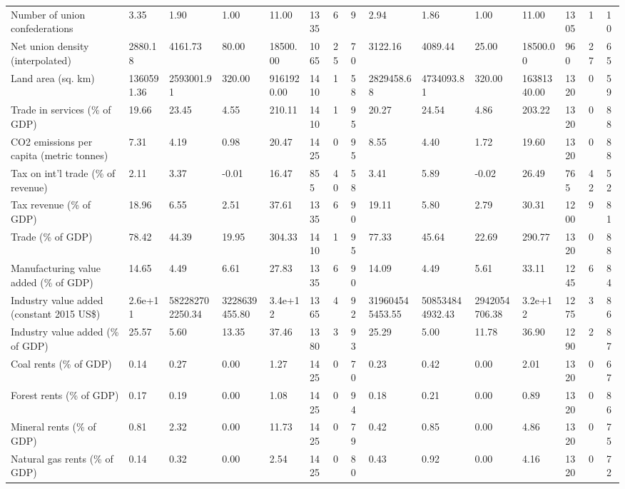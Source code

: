 \begin{longtable}{lllllllllllllll}
Number of union confederations & 3.35 & 1.90 & 1.00 & 11.00 & 1335 & 6 & 9 & 2.94 & 1.86 & 1.00 & 11.00 & 1305 & 1 & 10\\
Net union density (interpolated) & 2880.18 & 4161.73 & 80.00 & 18500.00 & 1065 & 25 & 70 & 3122.16 & 4089.44 & 25.00 & 18500.00 & 960 & 27 & 65\\
Land area (sq. km) & 1360591.36 & 2593001.91 & 320.00 & 9161920.00 & 1410 & 1 & 58 & 2829458.68 & 4734093.81 & 320.00 & 16381340.00 & 1320 & 0 & 59\\
Trade in services (\% of GDP) & 19.66 & 23.45 & 4.55 & 210.11 & 1410 & 1 & 95 & 20.27 & 24.54 & 4.86 & 203.22 & 1320 & 0 & 88\\
\addlinespace
CO2 emissions per capita (metric tonnes) & 7.31 & 4.19 & 0.98 & 20.47 & 1425 & 0 & 95 & 8.55 & 4.40 & 1.72 & 19.60 & 1320 & 0 & 88\\
Tax on int'l trade (\% of revenue) & 2.11 & 3.37 & -0.01 & 16.47 & 855 & 40 & 58 & 3.41 & 5.89 & -0.02 & 26.49 & 765 & 42 & 52\\
Tax revenue (\% of GDP) & 18.96 & 6.55 & 2.51 & 37.61 & 1335 & 6 & 90 & 19.11 & 5.80 & 2.79 & 30.31 & 1200 & 9 & 81\\
Trade (\% of GDP) & 78.42 & 44.39 & 19.95 & 304.33 & 1410 & 1 & 95 & 77.33 & 45.64 & 22.69 & 290.77 & 1320 & 0 & 88\\
Manufacturing value added (\% of GDP) & 14.65 & 4.49 & 6.61 & 27.83 & 1335 & 6 & 90 & 14.09 & 4.49 & 5.61 & 33.11 & 1245 & 6 & 84\\
\addlinespace
Industry value added (constant 2015 US\$) & 2.6e+11 & 582282702250.34 & 3228639455.80 & 3.4e+12 & 1365 & 4 & 92 & 319604545453.55 & 508534844932.43 & 2942054706.38 & 3.2e+12 & 1275 & 3 & 86\\
Industry value added (\% of GDP) & 25.57 & 5.60 & 13.35 & 37.46 & 1380 & 3 & 93 & 25.29 & 5.00 & 11.78 & 36.90 & 1290 & 2 & 87\\
Coal rents (\% of GDP) & 0.14 & 0.27 & 0.00 & 1.27 & 1425 & 0 & 70 & 0.23 & 0.42 & 0.00 & 2.01 & 1320 & 0 & 67\\
Forest rents (\% of GDP) & 0.17 & 0.19 & 0.00 & 1.08 & 1425 & 0 & 94 & 0.18 & 0.21 & 0.00 & 0.89 & 1320 & 0 & 86\\
Mineral rents (\% of GDP) & 0.81 & 2.32 & 0.00 & 11.73 & 1425 & 0 & 79 & 0.42 & 0.85 & 0.00 & 4.86 & 1320 & 0 & 75\\
\addlinespace
Natural gas rents (\% of GDP) & 0.14 & 0.32 & 0.00 & 2.54 & 1425 & 0 & 80 & 0.43 & 0.92 & 0.00 & 4.16 & 1320 & 0 & 72\\

\end{longtable}
